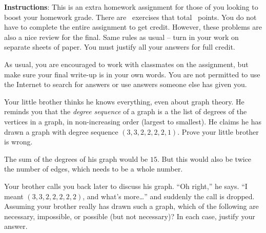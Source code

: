 \documentclass[10pt]{exam}
\begin{document}
\noindent \textbf{Instructions}: This is an extra homework assignment for those of you looking to boost your homework grade. There are \numquestions\, exercises that total \numpoints\, points. You do not have to complete the entire assignment to get credit. However, these problems are also a nice review for the final. Same rules as usual -- turn in your work on separate sheets of paper.  You must justify all your answers for full credit.

As usual, you are encouraged to work with classmates on the assignment, but make sure your final write-up is in your own words.  You are not permitted to use the Internet to search for answers or use answers someone else has given you.
 
\begin{questions}

\question[2] Your little brother thinks he knows everything, even about graph theory.  He reminds you that the \emph{degree sequence} of a graph is a the list of degrees of the vertices in a graph, in non-increasing order (largest to smallest). He claims he has drawn a graph with degree sequence $(3,3,2,2,2,2,1)$.  Prove your little brother is wrong.
  \begin{solution}
    The sum of the degrees of his graph would be $15$.  But this would also be twice the number of edges, which needs to be a whole number.
  \end{solution}


\question[10] Your brother calls you back later to discuss his graph. ``Oh right,'' he says.  ``I meant $(3,3,2,2,2,2,2)$, and what's more\ldots'' and suddenly the call is dropped.  Assuming your brother really has drawn such a graph, which of the following are necessary, impossible, or possible (but not necessary)?  In each case, justify your answer.

\end{questions}
\end{document}
